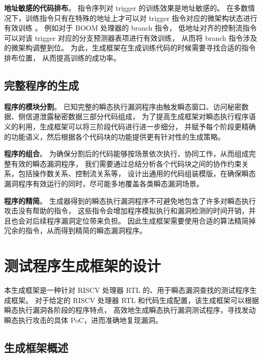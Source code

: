 \textbf{地址敏感的代码排布}。
指令序列对 trigger 的训练效果是地址敏感的。
在多数情况下，训练指令只有在特殊的地址上才可以对 trigger 指令对应的微架构状态进行有效训练 。
例如对于 BOOM 处理器\cite{celio2017boomv2}的 branch 指令，
低地址对齐的控制流指令可以对该 trigger 对应的分支预测器表项进行有效训练，
从而将 branch 指令涉及的微架构调整到位。
为此，生成框架在生成训练代码的时候需要寻找合适的指令排布位置，
从而提高训练的成功率。 \par

\subsection{完整程序的生成}

\textbf{程序的模块分割}。
已知完整的瞬态执行漏洞程序由触发瞬态窗口、访问秘密数据、侧信道泄露秘密数据三部分代码组成，
为了提高生成框架对瞬态执行程序语义的利用，生成框架可以将三阶段代码进行进一步细分，
并赋予每个阶段更精确的功能语义，然后根据各个代码块的功能提供更有针对性的生成策略。\par

\textbf{程序的组合}。
为确保分割后的代码能够按场景依次执行、协同工作，从而组成完整有效的瞬态漏洞程序，
我们需要通过总结分析各个代码块之间的协作约束关系，包括操作数关系、控制流关系等，
设计出通用的代码组装模版，在确保瞬态漏洞程序有效运行的同时，尽可能多地覆盖各类瞬态漏洞场景。\par

\textbf{程序的精简}。
生成器得到的瞬态执行漏洞程序不可避免地包含了许多对瞬态执行攻击没有帮助的指令，
这些指令会增加程序模拟执行和漏洞检测的时间开销，并且也会对后续程序漏洞定位带来负担。
因此生成框架需要使用合适的算法精简掉冗余的指令，从而得到精简的瞬态漏洞程序。\par

\cleardoublepage
\section{测试程序生成框架的设计}

本生成框架是一种针对 RISCV 处理器 RTL 的、用于瞬态漏洞查找的测试程序生成框架。
对于给定的 RISCV 处理器 RTL 和代码生成配置，该生成框架可以根据瞬态执行漏洞各阶段的程序特点，
高效地生成瞬态执行漏洞测试程序，寻找发动瞬态执行攻击的具体 PoC，进而准确地复现漏洞。 \par

\subsection{生成框架概述}

